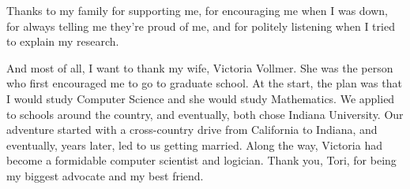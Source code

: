\begin{acknowledgments}
  Thanks to my family for supporting me, for encouraging me when I was down, for
  always telling me they're proud of me, and for politely listening when I tried
  to explain my research.

  And most of all, I want to thank my wife, Victoria Vollmer. She was the person
  who first encouraged me to go to graduate school. At the start, the plan was
  that I would study Computer Science and she would study Mathematics. We applied
  to schools around the country, and eventually, both chose Indiana University. Our
  adventure started with a cross-country drive from California to Indiana, and
  eventually, years later, led to us getting married. Along the way, Victoria had
  become a formidable computer scientist and logician. Thank you, Tori, for being
  my biggest advocate and my best friend.

\end{acknowledgments}
